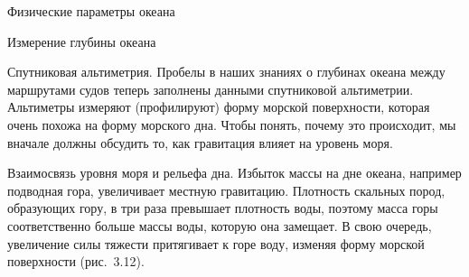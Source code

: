 \begin{chapter}{Физические параметры океана}
\begin{section}{Измерение глубины океана}
\begin{paragraph}{Спутниковая альтиметрия.}
Пробелы в наших знаниях о глубинах океана между маршрутами судов
теперь заполнены данными спутниковой альтиметрии. Альтиметры измеряют
(профилируют) форму морской поверхности, которая
очень похожа на форму морского дна. Чтобы понять, почему это
происходит, мы вначале должны обсудить то, как гравитация влияет на
уровень моря.
%

\begin{subparagraph}{Взаимосвязь уровня моря и рельефа дна.}
Избыток массы на дне океана, например подводная гора, увеличивает местную
гравитацию. Плотность скальных пород, образующих гору, в три раза превышает
плотность воды, поэтому масса горы соответственно больше массы воды, 
которую она замещает. В свою очередь, увеличение силы тяжести притягивает 
к горе воду, изменяя форму морской поверхности (рис.~3.12).
%


\end{subparagraph}
\end{paragraph}
\end{section}
\end{chapter}
